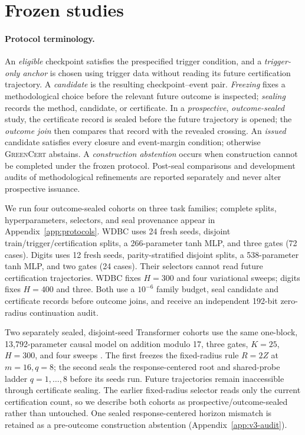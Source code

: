 \documentclass{article}
\newcommand{\method}{\textsc{GreenCert}}
\begin{document}
\section{Frozen studies}
\label{sec:protocol}

\paragraph{Protocol terminology.}
An \emph{eligible} checkpoint satisfies the prespecified trigger condition,
and a \emph{trigger-only anchor} is chosen using trigger data without reading
its future certification trajectory.  A \emph{candidate} is the resulting
checkpoint--event pair.  \emph{Freezing} fixes a methodological choice before
the relevant future outcome is inspected; \emph{sealing} records the method,
candidate, or certificate.  In a \emph{prospective}, \emph{outcome-sealed}
study, the certificate record is sealed before the future trajectory is
opened; the \emph{outcome join} then compares that record with the revealed
crossing.  An \emph{issued} candidate satisfies every closure and event-margin
condition; otherwise \method{} abstains.  A \emph{construction abstention}
occurs when construction cannot be completed under the frozen protocol.
Post-seal comparisons and development audits of methodological refinements
are reported separately and never alter prospective issuance.

We run four outcome-sealed cohorts on three task families; complete splits,
hyperparameters, selectors, and seal provenance appear in
Appendix~\ref{app:protocols}.  WDBC uses 24 fresh seeds, disjoint
train/trigger/certification splits, a 266-parameter tanh MLP, and three gates
(72 cases).  Digits uses 12 fresh seeds, parity-stratified disjoint splits, a
538-parameter tanh MLP, and two gates (24 cases).  Their selectors cannot read
future certification trajectories.  WDBC fixes $H=300$ and four variational
sweeps; digits fixes $H=400$ and three.  Both use a $10^{-6}$ family budget,
seal candidate and certificate records before outcome joins, and receive an
independent 192-bit zero-radius continuation audit.

Two separately sealed, disjoint-seed Transformer cohorts use the same one-block,
13,792-parameter causal model on addition modulo 17, three gates, $K=25$,
$H=300$, and four sweeps \citep{vaswani2017attention}.  The first freezes the
fixed-radius rule $R=2Z$ at $m=16,q=8$; the second seals the
response-centered root and shared-probe ladder $q=1,\ldots,8$ before its seeds
run.  Future trajectories remain inaccessible through certificate sealing.
The earlier fixed-radius selector reads only the current certification count,
so we describe both cohorts as prospective/outcome-sealed rather than
untouched.  One sealed response-centered horizon mismatch is retained as a
pre-outcome construction abstention (Appendix~\ref{app:v3-audit}).
\end{document}
